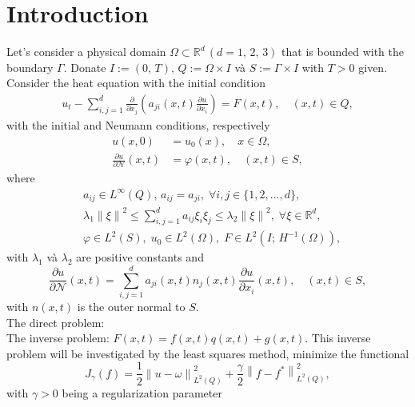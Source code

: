 \documentclass[]{article}
\begin{document}
\justifying

\thispagestyle{empty}
	
\newpage
\section{Introduction}
Let's consider a physical domain $\Omega \subset \mathbb{R}^d\,(d=1,\, 2,\, 3)$ that is bounded with the boundary $\Gamma$. Donate $I:=(0,\, T),\, Q:=\Omega\times I$ và $ S:=\Gamma \times I$ with $T>0$ given. 
\\
Consider the heat equation with the initial condition
\begin{align}
	u_t-\sum_{i, j=1}^{d}\frac{\partial}{\partial x_j}\left(a_{ji}(x, t)\frac{\partial u}{\partial x_i}\right)=F(x, t), \quad(x, t)\in Q,\label{1.1}
\end{align}
with the initial and Neumann conditions, respectively
\begin{align}
	u(x, 0)&=u_0(x),\quad x\in \Omega,\label{1.2}\\
	\frac{\partial u}{\partial \mathcal{N}}(x, t)&=\varphi(x, t),\quad(x, t)\in S,\label{1.3}
\end{align}
where
\begin{align*}
	&a_{ij}\in L^{\infty}(Q),\, a_{ij}=a_{ji},\; \forall i, j\in \{1, 2, ..., d\},\\
	&\lambda_1\left\|\xi\right\|^2\leq \sum_{i, j=1}^{d}a_{ij}\xi_i\xi_j\leq \lambda_2\left\|\xi\right\|^2,\; \forall \xi\in\mathbb{R}^d,\\
	&\varphi\in L^2(S),\; u_0\in L^2(\Omega),\; F\in L^2(I;\, H^{-1}(\Omega)),
\end{align*}
with $\lambda_1$ và $\lambda_2$ are positive constants and 
$$\frac{\partial u}{\partial \mathcal{N}}(x, t)=\sum_{i, j=1}^d a_{ji}(x, t)n_j(x, t)\frac{\partial u}{\partial x_i}(x, t),\quad (x, t)\in S,$$
with $n(x, t)$ is the outer normal to $S$.
\\
The direct problem: 
\\
The inverse problem: $F(x, t) = f(x, t) q(x, t) + g(x, t)$.
This inverse problem will be investigated by the least squares method, minimize the functional
$$J_{\gamma}(f)=\frac{1}{2}\left\|u-\omega\right\|_{L^2(Q)}^2+\frac{\gamma}{2}\left\|f-f^*\right\|_{L^2(Q)}^2,$$
with $\gamma>0$ being a regularization parameter\\
\end{document}
